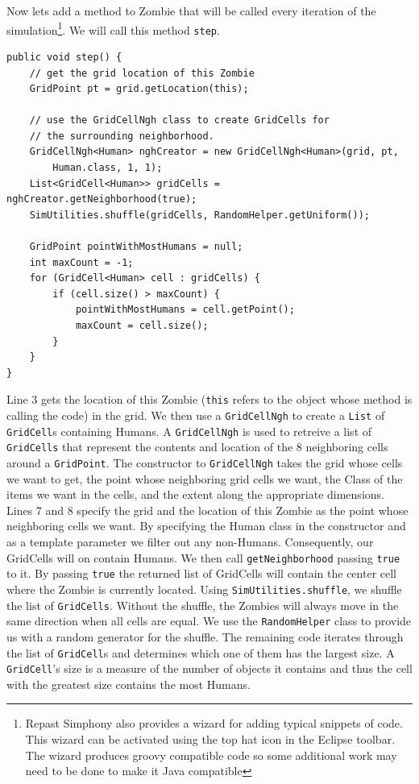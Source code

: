 \documentclass[11pt]{amsart}
\begin{document}
Now lets add a method to Zombie that will be called every iteration of the simulation\footnote{Repast Simphony also provides a wizard for adding typical snippets of code. This wizard can be activated using the top hat icon in the Eclipse toolbar. The wizard produces groovy compatible code so some additional work may need to be done to make it Java compatible}.  We will call this method \texttt{step}.

\noindent\begin{minipage}[h]{\textwidth}
\vspace{.2in}
\lstset{language=java,caption=step Method}
\begin{lstlisting}
public void step() {
	// get the grid location of this Zombie
	GridPoint pt = grid.getLocation(this);
	
	// use the GridCellNgh class to create GridCells for 
	// the surrounding neighborhood.
	GridCellNgh<Human> nghCreator = new GridCellNgh<Human>(grid, pt, 
		Human.class, 1, 1);
	List<GridCell<Human>> gridCells = nghCreator.getNeighborhood(true);
	SimUtilities.shuffle(gridCells, RandomHelper.getUniform());
	
	GridPoint pointWithMostHumans = null;
	int maxCount = -1;
	for (GridCell<Human> cell : gridCells) {
		if (cell.size() > maxCount) {
			pointWithMostHumans = cell.getPoint();
			maxCount = cell.size();
		}
	}
}
\end{lstlisting}
\vspace{.2in}
\end{minipage}

Line 3 gets the location of this Zombie (\texttt{this} refers to the object whose method is calling the code) in the grid. We then use a \texttt{GridCellNgh} to create a \texttt{List} of \texttt{GridCell}s containing Humans. A  \texttt{GridCellNgh} is used to retreive a list of \texttt{GridCells} that represent the contents and location of the 8 neighboring cells around a \texttt{GridPoint}. The constructor to \texttt{GridCellNgh} takes the grid whose cells we want to get, the point whose neighboring grid cells we want, the Class of the items we want in the cells, and the extent along the appropriate dimensions. Lines 7 and 8 specify the grid and the location of this Zombie as the point whose neighboring cells we want. By specifying the Human class in the constructor and as a template parameter we filter out any non-Humans. Consequently, our GridCells will on contain Humans. We then call \texttt{getNeighborhood} passing \texttt{true} to it. By passing \texttt{true} the returned list of GridCells will contain the center cell where the Zombie is currently located. Using \texttt{SimUtilities.shuffle}, we shuffle the list of \texttt{GridCells}. Without the shuffle, the Zombies will always move in the same direction when all cells are equal. We use the \texttt{RandomHelper} class to provide us with a random generator for the shuffle. The remaining code iterates through the list of \texttt{GridCell}s and determines which one of them has the largest size. A \texttt{GridCell}'s size is a measure of the number of objects it contains and thus the cell with the greatest size contains the most Humans.
\end{document}
